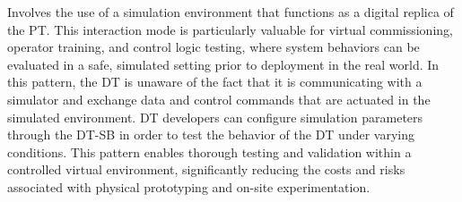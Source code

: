 Involves the use of a simulation environment that functions as a digital replica of the PT.
This interaction mode is particularly valuable for virtual commissioning, operator training, and control logic testing, where system behaviors can be evaluated in a safe, simulated setting prior to deployment in the real world.
In this pattern, the DT is unaware of the fact that it is communicating with a simulator and exchange data and control commands that are actuated in the simulated environment.
DT developers can configure simulation parameters through the DT-SB in order to test the behavior of the DT under varying conditions.
%
This pattern enables thorough testing and validation within a controlled virtual environment, significantly reducing the costs and risks associated with physical prototyping and on-site experimentation.
